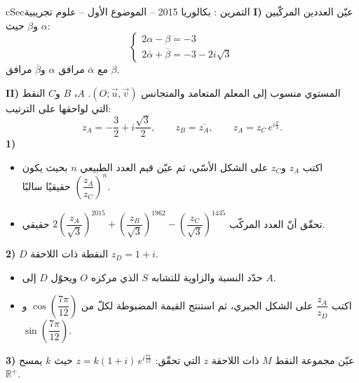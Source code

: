 \documentclass[12pt,a4paper]{article}
\newenvironment{BOX}[2]{\begin{otherlanguage}{english}\begin{arbox}{#1}{#2}}{\end{arbox}\end{otherlanguage}}
\newcounter{exo}
\newenvironment{tamrin}[1]{\stepcounter{exo}\begin{BOX}{cSec}{التمرين \theexo: #1}}{\end{BOX}}
\newcommand{\R}{\mathbb{R}}
\newenvironment{sq}{\begin{itemize}[leftmargin=2.4em,itemsep=3pt]}{\end{itemize}}
\newcommand{\qa}{\item[(أ)]}\newcommand{\qb}{\item[(ب)]}\newcommand{\qc}{\item[(جـ)]}\newcommand{\qd}{\item[(د)]}\newcommand{\qe}{\item[(هـ)]}
\begin{document}
\begin{tamrin}{بكالوريا 2015 -- الموضوع الأول -- علوم تجريبية}
\textbf{I)} عيّن العددين المركّبين $\alpha$ و$\beta$ حيث:
\[\begin{cases}2\alpha-\beta=-3\\[2pt] 2\overline{\alpha}+\overline{\beta}=-3-2i\sqrt3\end{cases}\]
مع $\overline{\alpha}$ مرافق $\alpha$ و$\overline{\beta}$ مرافق $\beta$.

\textbf{II)} المستوي منسوب إلى المعلم المتعامد والمتجانس $(O;\vec u,\vec v)$. $A$، $B$ و$C$ النقط التي لواحقها على الترتيب:
\[z_A=-\frac32+i\frac{\sqrt3}{2},\qquad z_B=\overline{z_A},\qquad z_A=z_C\,e^{i\frac{\pi}{3}}.\]
\textbf{1)}
\begin{sq}
\qa اكتب $z_A$ و$z_C$ على الشكل الأسّي، ثم عيّن قيم العدد الطبيعي $n$ بحيث يكون $\left(\dfrac{z_A}{z_C}\right)^{n}$ حقيقيًا سالبًا.
\qb تحقّق أنّ العدد المركّب $2\left(\dfrac{z_A}{\sqrt3}\right)^{2015}+\left(\dfrac{z_B}{\sqrt3}\right)^{1962}-\left(\dfrac{z_C}{\sqrt3}\right)^{1435}$ حقيقي.
\end{sq}
\textbf{2)} $D$ النقطة ذات اللاحقة $z_D=1+i$.
\begin{sq}
\qa حدّد النسبة والزاوية للتشابه $S$ الذي مركزه $O$ ويحوّل $D$ إلى $A$.
\qb اكتب $\dfrac{z_A}{z_D}$ على الشكل الجبري، ثم استنتج القيمة المضبوطة لكلّ من $\cos\left(\dfrac{7\pi}{12}\right)$ و$\sin\left(\dfrac{7\pi}{12}\right)$.
\end{sq}
\textbf{3)} عيّن مجموعة النقط $M$ ذات اللاحقة $z$ التي تحقّق: $z=k(1+i)\,e^{i\frac{7\pi}{12}}$ حيث $k$ يمسح $\R^{+}$.
\end{tamrin}
\end{document}
